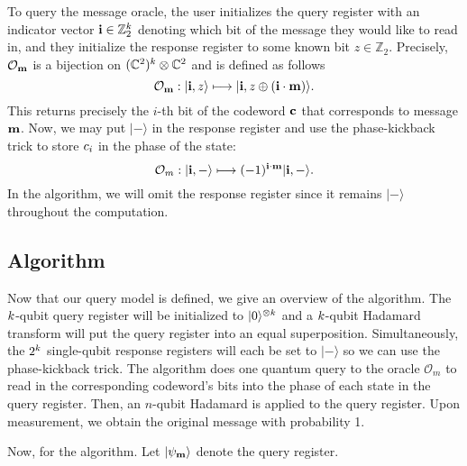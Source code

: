 \documentclass[12pt,twoside]{reedthesis}
\theoremstyle{definition}
\newcommand{\Z}{\mathbb{Z}}
\newcommand{\C}{\mathbb{C}}
\newcommand{\ket}[1]{\ensuremath{\lvert #1\rangle}\xspace}
\newcommand{\Hminus}{\ensuremath{\lvert- \rangle}\xspace}
\begin{document}
To query the message oracle, the user initializes the query register with an indicator vector $\mathbf{i} \in \Z_2^\mlen$ denoting which bit of the message they would like to read in, and they initialize the response register to some known bit $z\in\Z_2$. Precisely, $\mathcal{O}_\mathbf{m}$ is a bijection on $(\C^2)^\mlen \otimes \C^2$ and is defined as follows
\begin{equation*}
\mathcal{O}_\mess: \ket{\mathbf{i}, \rr} \longmapsto \ket{\mathbf{i}, \rr \oplus (\mathbf{i} \cdot \mess)}.
\end{equation*} 
This returns precisely the $i$-th bit of the codeword $\mathbf{c}$ that corresponds to message $\mathbf{m}$. Now, we may put $\Hminus$ in the response register and use the phase-kickback trick to store $c_{i}$ in the phase of the state:
\begin{equation*}
\mathcal{O}_m: \ket{\mathbf{i}, -} \longmapsto (-1)^{\mathbf{i} \cdot \mess}\ket{\mathbf{i},-}.
\end{equation*}
In the algorithm, we will omit the response register since it remains $\Hminus$ throughout the computation.
\subsection{Algorithm}

Now that our query model is defined, we give an overview of the algorithm. The $k$-qubit query register will be initialized to $\ket{0}^{\otimes \mlen}$ and a $k$-qubit Hadamard transform will put the query register into an equal superposition. Simultaneously, the $2^k$ single-qubit response registers will each be set to $\Hminus$ so we can use the phase-kickback trick. The algorithm does one quantum query to the oracle $\mathcal{O}_m$ to read in the corresponding codeword's bits into the phase of each state in the query register. Then, an $n$-qubit Hadamard is applied to the query register. Upon measurement, we obtain the original message with probability 1.

Now, for the algorithm. Let $\ket{\psi_\mess}$ denote the query register.
\end{document}
